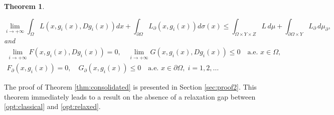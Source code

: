 \documentclass{article}
\newtheorem{theorem}{Theorem}[section]
\theoremstyle{definition}
\theoremstyle{remark}
\begin{document}
\begin{theorem}
\begin{enumerate}[label=\roman*.,ref=(\roman*)]
     \begin{equation}\label{eq:Lineq}
 \lim_{i\to+\infty}\int_\Omega L(x,g_i(x),Dg_i(x))dx+ \int_{\partial\Omega} L_\partial(x,g_i(x))d\sigma(x) \leq \int_{\Omega\times Y\times Z} L\,d\mu+\int_{\partial\Omega\times Y} L_\partial\,d\mu_\partial,
 \end{equation}
 and %
 \begin{gather}
  \label{eq:limF}
  \lim_{i\to+\infty}
  F(x,g_i(x),D g_i(x))=0,\quad  \lim_{i\to+\infty}
  G(x,g_i(x),D g_i(x))\le 0 \quad %
  \text{a.e. }x\in\Omega,\\
  \label{eq:limG}
  F_\partial(x,g_i(x))=0,\quad G_\partial(x,g_i(x))\le 0\quad \text{a.e. }
   x\in\partial\Omega, \;i=1,2,\dots %
%
%
%
 \end{gather}
 \end{enumerate}
\end{theorem}
%

The proof of Theorem \ref{thm:consolidated} is presented in Section \ref{sec:proof2}. This theorem immediately leads to a result on the absence of a relaxation gap between \eqref{opt:classical} and \eqref{opt:relaxed}. %
\end{document}

